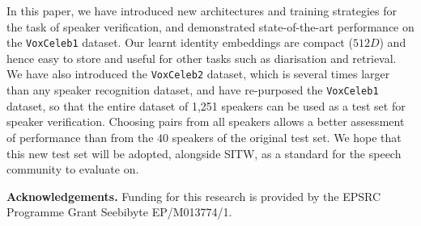 \documentclass[a4paper]{article}
\def\newpara{\vspace{2pt}}
\begin{document}
In this paper, we have introduced new architectures and training strategies for the task of speaker verification, and demonstrated state-of-the-art performance on the \texttt{VoxCeleb1} dataset. 
Our learnt identity embeddings are compact ($512D$) and hence easy to store and useful for other tasks such as diarisation and retrieval.
We have also introduced the \texttt{VoxCeleb2} dataset, which is several times larger than any speaker recognition dataset, and
have re-purposed the \texttt{VoxCeleb1}  dataset, so that the entire dataset 
of 1,251 speakers can be used as
a test set for speaker verification. Choosing pairs from all speakers allows a 
better assessment of performance than from the $40$ speakers of the original test set. We hope that this
new test set will be adopted, alongside SITW, as a standard for the speech community to
evaluate on.


 \newpara\noindent\textbf{Acknowledgements.}
 Funding for this research is provided by the EPSRC 
 Programme Grant Seebibyte EP/M013774/1. 




\end{document}
